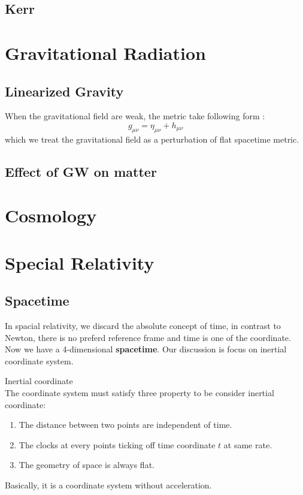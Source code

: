 \documentclass[12pt]{article}
\theoremstyle{mystyle}{\newtheorem{definition}{Definition}[section]}
\theoremstyle{mystyle}{\newtheorem{theorem}[definition]{Theorem}}
\theoremstyle{mystyle}{\newtheorem*{remark}{Remark}}
\theoremstyle{mystyle}{\newtheorem*{example}{Example}}
\theoremstyle{mystyle}{\newtheorem*{examples}{Examples}}
\theoremstyle{cstyle}{\newtheorem*{cthm}{}}
\begin{document}
\subsection{Kerr}

\section{Gravitational Radiation}
\subsection{Linearized Gravity}
When the gravitational field are weak, the metric take following form :\[g_{\mu\nu} = \eta_{\mu\nu} + h_{\mu\nu} \]
which we treat the gravitational field as a perturbation of flat spacetime metric.
\subsection{Effect of GW on matter}
\section{Cosmology}


\newpage
\appendix
{}

\section{Special Relativity}


\subsection{Spacetime}
In spacial relativity, we discard the absolute concept of time, in contrast to Newton, there is no preferd reference frame
and time is one of the coordinate.
Now we have a 4-dimensional \textbf{spacetime}. Our discussion is focus on inertial coordinate system.
\begin{definition}
  Inertial coordinate \\
  The coordinate system must satisfy three property to be consider inertial coordinate:
  \begin{enumerate}
    \item The distance between two points are independent of time.
    \item The clocks at every points ticking off time coordinate $t$ at same rate.
    \item The geometry of space is always flat.
  \end{enumerate}
  Basically, it is a coordinate system without acceleration.
\end{definition}
\end{document}

